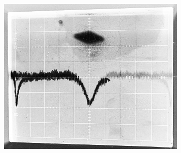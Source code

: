 \documentclass[14pt, a4paper]{report}
\begin{document}
\begin{figure}[H]
\begin{subfigure}{.33\textwidth}
\end{subfigure}
\begin{subfigure}{.33\textwidth}
  \centering
  \includegraphics[width=.95\linewidth]{../images/5101-9c}
\end{subfigure}%
\end{figure}
\end{document}
